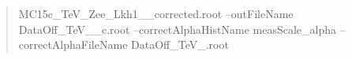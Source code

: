 \begin{quote}
M\+C15c\+\_\+Te\+V\+\_\+\+Zee\+\_\+\+Lkh1\+\_\+\_\+corrected.\+root --out\+File\+Name Data\+Off\+\_\+Te\+V\+\_\+\_\+c.\+root --correct\+Alpha\+Hist\+Name meas\+Scale\+\_\+alpha --correct\+Alpha\+File\+Name Data\+Off\+\_\+Te\+V\+\_.\+root \end{quote}
